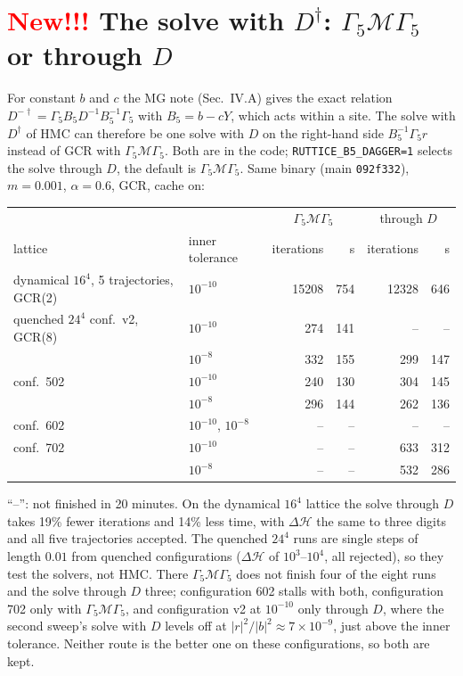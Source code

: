 \documentclass[11pt,a4paper]{article}
\numberwithin{equation}{section}
\newcommand{\dg}{^{\dagger}}
\newcommand{\Gfive}{\Gamma_5}
\newcommand{\code}[1]{\texttt{\small #1}}
\begin{document}
\section{\textcolor{red}{New!!!} The solve with $D\dg$: $\Gfive\mathcal M\Gfive$ or through $D$}
For constant $b$ and $c$ the MG note (Sec.~IV.A) gives the exact relation
$D^{-\dagger}=\Gfive B_5D^{-1}B_5^{-1}\Gfive$ with $B_5=b-cY$, which acts within a site. The solve
with $D\dg$ of HMC can therefore be one solve with $D$ on the right-hand side $B_5^{-1}\Gfive r$
instead of GCR with $\Gfive\mathcal M\Gfive$. Both are in the code; \code{RUTTICE\_B5\_DAGGER=1}
selects the solve through $D$, the default is $\Gfive\mathcal M\Gfive$. Same binary (main
\code{092f332}), $m=0.001$, $\alpha=0.6$, GCR, cache on:
\begin{center}
\begin{tabular}{@{}llrrrr@{}}
\toprule
 & & \multicolumn{2}{c}{$\Gfive\mathcal M\Gfive$} & \multicolumn{2}{c}{through $D$}\\
lattice & inner tolerance & iterations & s & iterations & s\\
\midrule
dynamical $16^4$, 5 trajectories, GCR(2) & $10^{-10}$ & 15208 & 754 & 12328 & 646\\
quenched $24^4$ conf.\ v2, GCR(8) & $10^{-10}$ & 274 & 141 & -- & --\\
 & $10^{-8}$ & 332 & 155 & 299 & 147\\
\phantom{quenched $24^4$} conf.\ 502 & $10^{-10}$ & 240 & 130 & 304 & 145\\
 & $10^{-8}$ & 296 & 144 & 262 & 136\\
\phantom{quenched $24^4$} conf.\ 602 & $10^{-10}$, $10^{-8}$ & -- & -- & -- & --\\
\phantom{quenched $24^4$} conf.\ 702 & $10^{-10}$ & -- & -- & 633 & 312\\
 & $10^{-8}$ & -- & -- & 532 & 286\\
\bottomrule
\end{tabular}
\end{center}
``--'': not finished in 20 minutes. On the dynamical $16^4$ lattice the solve through $D$ takes
19\% fewer iterations and 14\% less time, with $\Delta\mathcal H$ the same to three digits and all
five trajectories accepted. The quenched $24^4$ runs are single steps of length $0.01$ from
quenched configurations ($\Delta\mathcal H$ of $10^3$--$10^4$, all rejected), so they test the
solvers, not HMC. There $\Gfive\mathcal M\Gfive$ does not finish four of the eight runs and the
solve through $D$ three; configuration 602 stalls with both, configuration 702 only with
$\Gfive\mathcal M\Gfive$, and configuration v2 at $10^{-10}$ only through $D$, where the second
sweep's solve with $D$ levels off at $|r|^2/|b|^2\approx7\times10^{-9}$, just above the inner
tolerance. Neither route is the better one on these configurations, so both are kept.
\end{document}
